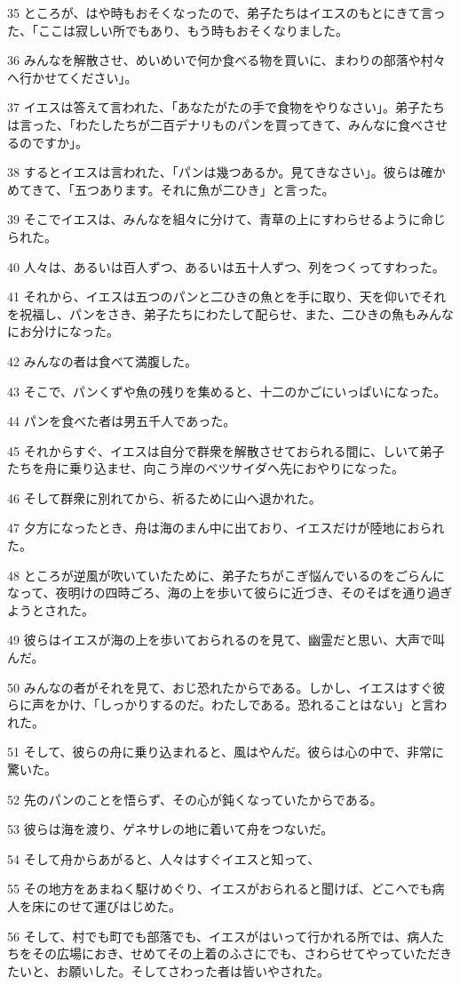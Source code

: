 \par 35 ところが、はや時もおそくなったので、弟子たちはイエスのもとにきて言った、「ここは寂しい所でもあり、もう時もおそくなりました。
\par 36 みんなを解散させ、めいめいで何か食べる物を買いに、まわりの部落や村々へ行かせてください」。
\par 37 イエスは答えて言われた、「あなたがたの手で食物をやりなさい」。弟子たちは言った、「わたしたちが二百デナリものパンを買ってきて、みんなに食べさせるのですか」。
\par 38 するとイエスは言われた、「パンは幾つあるか。見てきなさい」。彼らは確かめてきて、「五つあります。それに魚が二ひき」と言った。
\par 39 そこでイエスは、みんなを組々に分けて、青草の上にすわらせるように命じられた。
\par 40 人々は、あるいは百人ずつ、あるいは五十人ずつ、列をつくってすわった。
\par 41 それから、イエスは五つのパンと二ひきの魚とを手に取り、天を仰いでそれを祝福し、パンをさき、弟子たちにわたして配らせ、また、二ひきの魚もみんなにお分けになった。
\par 42 みんなの者は食べて満腹した。
\par 43 そこで、パンくずや魚の残りを集めると、十二のかごにいっぱいになった。
\par 44 パンを食べた者は男五千人であった。
\par 45 それからすぐ、イエスは自分で群衆を解散させておられる間に、しいて弟子たちを舟に乗り込ませ、向こう岸のベツサイダへ先におやりになった。
\par 46 そして群衆に別れてから、祈るために山へ退かれた。
\par 47 夕方になったとき、舟は海のまん中に出ており、イエスだけが陸地におられた。
\par 48 ところが逆風が吹いていたために、弟子たちがこぎ悩んでいるのをごらんになって、夜明けの四時ごろ、海の上を歩いて彼らに近づき、そのそばを通り過ぎようとされた。
\par 49 彼らはイエスが海の上を歩いておられるのを見て、幽霊だと思い、大声で叫んだ。
\par 50 みんなの者がそれを見て、おじ恐れたからである。しかし、イエスはすぐ彼らに声をかけ、「しっかりするのだ。わたしである。恐れることはない」と言われた。
\par 51 そして、彼らの舟に乗り込まれると、風はやんだ。彼らは心の中で、非常に驚いた。
\par 52 先のパンのことを悟らず、その心が鈍くなっていたからである。
\par 53 彼らは海を渡り、ゲネサレの地に着いて舟をつないだ。
\par 54 そして舟からあがると、人々はすぐイエスと知って、
\par 55 その地方をあまねく駆けめぐり、イエスがおられると聞けば、どこへでも病人を床にのせて運びはじめた。
\par 56 そして、村でも町でも部落でも、イエスがはいって行かれる所では、病人たちをその広場におき、せめてその上着のふさにでも、さわらせてやっていただきたいと、お願いした。そしてさわった者は皆いやされた。

